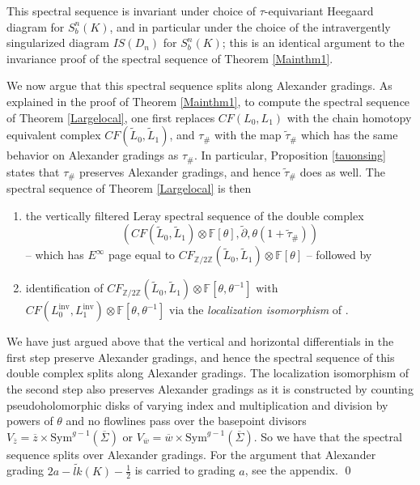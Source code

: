 \documentclass[11pt]{amsart}
\theoremstyle{definition}
\theoremstyle{remark}
\def\F{\mathbb{F}}
\def\Z{\mathbb{Z}}
\def\Sym{\mathrm{Sym}}
\newcommand{\Lo}{L_0^{\operatorname{inv}}}
\newcommand{\Li}{L_1^{\operatorname{inv}}}
\numberwithin{equation}{section}
\begin{document}
This spectral sequence is invariant under choice of $\tau$-equivariant Heegaard diagram for $S^n_b(K)$, and in particular under the choice of the intravergently singularized diagram $IS(D_n)$ for $S^n_b(K)$; this is an identical argument to the invariance proof of the spectral sequence of Theorem \ref{Mainthm1}. 

We now argue that this spectral sequence splits along Alexander gradings. As explained in the proof of Theorem \ref{Mainthm1}, to compute the spectral sequence of Theorem \ref{Largelocal}, one first replaces $CF(L_0,L_1)$ with the chain homotopy equivalent complex $CF(\widetilde{L}_0,\widetilde{L}_1)$, and $\tau_\#$ with the map $\widetilde{\tau}_\#$ which has the same behavior on Alexander gradings as $\tau_\#$. In particular, Proposition \ref{tauonsing} states that $\tau_\#$ preserves Alexander gradings, and hence $\widetilde{\tau}_\#$ does as well. The spectral sequence of Theorem \ref{Largelocal} is then

\begin{enumerate}
    \item the vertically filtered Leray spectral sequence of the double complex \[(CF(\widetilde{L}_0,\widetilde{L}_1)\otimes \F[\theta],\widetilde{\partial},\theta(1+\widetilde{\tau}_\#))\] -- which has $E^\infty$ page equal to $CF_{\Z/2\Z}(\widetilde{L}_0,\widetilde{L}_1)\otimes \F[\theta]$ -- followed by
    \item identification of $CF_{\Z/2\Z}(\widetilde{L}_0,\widetilde{L}_1)\otimes \F[\theta,\theta^{-1}]$ with $CF(\Lo,\Li)\otimes \F[\theta,\theta^{-1}]$ via the \emph{localization isomorphism} of \cite[~Theorem 1.1]{Large}.
\end{enumerate}
We have just argued above that the vertical and horizontal differentials in the first step preserve Alexander gradings, and hence the spectral sequence of this double complex splits along Alexander gradings. The localization isomorphism of the second step also preserves Alexander gradings as it is constructed by counting pseudoholomorphic disks of varying index and multiplication and division by powers of $\theta$ and no flowlines pass over the basepoint divisors $V_{\overline{z}}=\overline{z}\times \Sym^{g-1}(\overline{\Sigma})$ or $V_{\overline{w}}=\overline{w}\times \Sym^{g-1}(\overline{\Sigma})$. So we have that the spectral sequence splits over Alexander gradings. For the argument that Alexander grading $2a-\widetilde{lk}(K)-\frac{1}{2}$ is carried to grading $a$, see the appendix.
\qed
\end{document}
